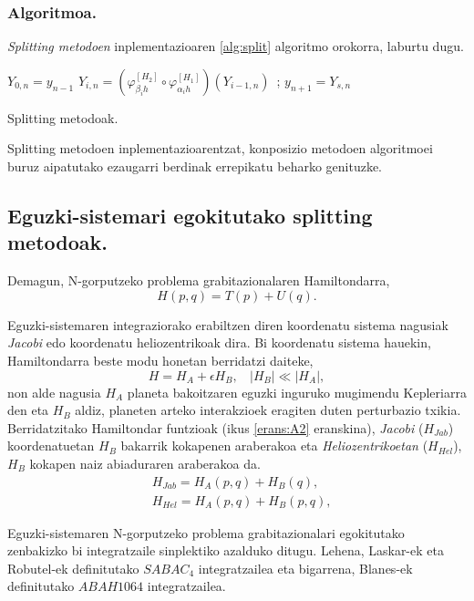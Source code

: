 \subsubsection*{Algoritmoa.}

\emph{Splitting metodoen} inplementazioaren \ref{alg:split} algoritmo orokorra, laburtu dugu.

\begin{algorithm}[H]
 \BlankLine
  {
   \BlankLine
    $Y_{0,n}=y_{n-1} $\;
    \BlankLine
   {
    \BlankLine 
    $Y_{i,n}=(\varphi^{[H_2]}_{\beta_i h} \circ \varphi^{[H_1]}_{\alpha_i h})(Y_{i-1,n})$\ ;
   }
   \BlankLine
    $y_{n+1}=Y_{s,n}$\;
   \BlankLine
 }
 \caption{Splitting metodoak.}
 \label{alg:split}
\end{algorithm}

Splitting metodoen inplementazioarentzat, konposizio metodoen algoritmoei buruz aipatutako ezaugarri berdinak errepikatu beharko genituzke. 

\subsection{Eguzki-sistemari egokitutako splitting metodoak.}

Demagun, N-gorputzeko problema grabitazionalaren Hamiltondarra,
\begin{equation*}
H(p,q)=T(p)+U(q).
\end{equation*}

Eguzki-sistemaren integraziorako erabiltzen diren koordenatu sistema nagusiak \emph{Jacobi} edo koordenatu heliozentrikoak dira.  Bi koordenatu sistema hauekin, Hamiltondarra beste modu honetan berridatzi daiteke,
\begin{equation*}
H=H_A+\epsilon H_B,  \ \ \ \ |H_B|\ll|H_A|,
\end{equation*}
non alde nagusia $H_A$ planeta bakoitzaren eguzki inguruko mugimendu Kepleriarra den eta $H_B$ aldiz, planeten arteko interakzioek eragiten duten perturbazio txikia. Berridatzitako Hamiltondar funtzioak (ikus \ref{erans:A2} eranskina), \emph{Jacobi} ($H_{Jab}$) koordenatuetan $H_B$ bakarrik kokapenen araberakoa eta \emph{Heliozentrikoetan} ($H_{Hel}$), $H_B$ kokapen naiz abiaduraren araberakoa da.
\begin{align*}
&H_{Jab}=H_A(p,q)+H_B(q), \\
&H_{Hel}=H_A(p,q)+H_B(p,q), 
\end{align*}       

Eguzki-sistemaren N-gorputzeko problema grabitazionalari egokitutako zenbakizko bi integratzaile sinplektiko azalduko ditugu. Lehena, Laskar-ek eta Robutel-ek \cite[~2001]{Laskar2001} definitutako \emph{$SABAC_4$} integratzailea eta bigarrena, Blanes-ek \cite[~2013]{Blanes2013} \cite{Farres2013} definitutako \emph{$ABAH1064$} integratzailea. 


